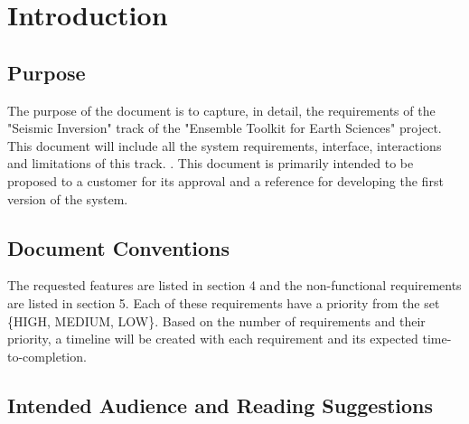 \documentclass{scrreprt}
\begin{document}
\chapter{Introduction}

\section{Purpose}

The purpose of the document is to capture, in detail, the requirements of the "Seismic Inversion" track of the "Ensemble Toolkit for Earth Sciences" project. This document will include all the system requirements, interface, interactions and limitations of this track. . This document is primarily intended to be proposed to a customer for its approval
and a reference for developing the first version of the system.

\section{Document Conventions}

The requested features are listed in section 4 and the non-functional requirements are listed in section 5. Each of these requirements have a priority from the set \{HIGH, MEDIUM, LOW\}. Based on the number of requirements and their priority, a timeline will be created with each requirement and its expected time-to-completion.

\section{Intended Audience and Reading Suggestions}
\end{document}
